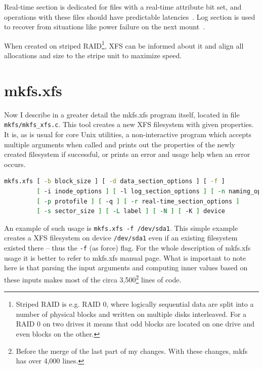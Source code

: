 Real-time section is dedicated for files with a real-time attribute bit set, and operations with these files should have predictable latencies~\cite{xfsRealtime}. Log section is used to recover from situations like power failure on the next mount~\cite{xfsStructure,xfsman}.

When created on striped RAID\footnote{Striped RAID is e.g. RAID 0, where logically sequential data are split into a number of physical blocks and written on multiple disks interleaved. For a RAID 0 on two drives it means that odd blocks are located on one drive and even blocks on the other.}, XFS can be informed about it and align all allocations and size to the stripe unit to maximize speed.

\section{mkfs.xfs}\label{chap:xfs:mkfs}
Now I describe in a greater detail the mkfs.xfs program itself, located in file {\tt mkfs/mkfs\_xfs.c}. This tool creates a new XFS filesystem with given properties. It is, as is usual for core Unix utilities, a non-interactive program which accepts multiple arguments when called and prints out the properties of the newly created filesystem if successful, or prints an error and usage help when an error occurs.

\begin{lstlisting}[frame=none, basicstyle=\footnotesize\ttfamily, language=Bash, numbers=none, numberstyle=\tiny\color{black},caption= {Synopsis of mkfs.xfs utility~\cite{mkfs.xfsMan}.}]
mkfs.xfs [ -b block_size ] [ -d data_section_options ] [ -f ]
         [ -i inode_options ] [ -l log_section_options ] [ -n naming_options ]
         [ -p protofile ] [ -q ] [ -r real-time_section_options ]
         [ -s sector_size ] [ -L label ] [ -N ] [ -K ] device
\end{lstlisting}

An example of such usage is {\tt mkfs.xfs -f /dev/sda1}. This simple example creates a XFS filesystem on device {\tt /dev/sda1} even if an existing filesystem existed there -- thus the {\tt -f} (as force) flag. For the whole description of mkfs.xfs usage it is better to refer to mkfs.xfs manual page. What is important to note here is that parsing the input arguments and computing inner values based on these inputs makes most of the circa 3,500\footnote{Before the merge of the last part of my changes. With these changes, mkfs has over 4,000 lines.} lines of code.

